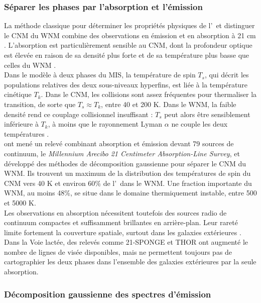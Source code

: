 \subsubsection{Séparer les phases par l'absorption et l'émission}

La méthode classique pour déterminer les propriétés physiques de l'\HI\ et distinguer le CNM du WNM combine des observations en émission et en absorption à 21 cm \citep{Kulkarni1988, Dickey1990, Heiles2003a}. L'absorption est particulièrement sensible au CNM, dont la profondeur optique est élevée en raison de sa densité plus forte et de sa température plus basse que celles du WNM \citep{kanekar2003, Roy2013}.\\\indent
Dans le modèle à deux phases du MIS, la température de spin $T_s$, qui décrit les populations relatives des deux sous-niveaux hyperfins, est liée à la température cinétique $T_k$. Dans le CNM, les collisions sont assez fréquentes pour thermaliser la transition, de sorte que $T_s \approx T_k$, entre 40 et 200 K. Dans le WNM, la faible densité rend ce couplage collisionnel insuffisant : $T_s$ peut alors être sensiblement inférieure à $T_k$, à moins que le rayonnement Lyman $\alpha$ ne couple les deux températures \citep{Field1958, Liszt2001, Heiles2003b}.\\\indent
\citet{Heiles2003a, Heiles2003b} ont mené un relevé combinant absorption et émission devant 79 sources de continuum, le \textit{Millennium Arecibo 21 Centimeter Absorption-Line Survey}, et développé des méthodes de décomposition gaussienne pour séparer le CNM du WNM. Ils trouvent un maximum de la distribution des températures de spin du CNM vers 40 K et environ 60\% de l'\HI\ dans le WNM. Une fraction importante du WNM, au moins 48\%, se situe dans le domaine thermiquement instable, entre 500 et 5000 K.\\\indent
Les observations en absorption nécessitent toutefois des sources radio de continuum compactes et suffisamment brillantes en arrière-plan. Leur rareté limite fortement la couverture spatiale, surtout dans les galaxies extérieures \citep{kanekar2003, Murray2018}. Dans la Voie lactée, des relevés comme 21-SPONGE \citep{Murray2018} et THOR \citep{Beuther2016} ont augmenté le nombre de lignes de visée disponibles, mais ne permettent toujours pas de cartographier les deux phases dans l'ensemble des galaxies extérieures par la seule absorption.

\subsubsection{Décomposition gaussienne des spectres d'émission}
\label{subsubsec:gaussian_decomposition}

